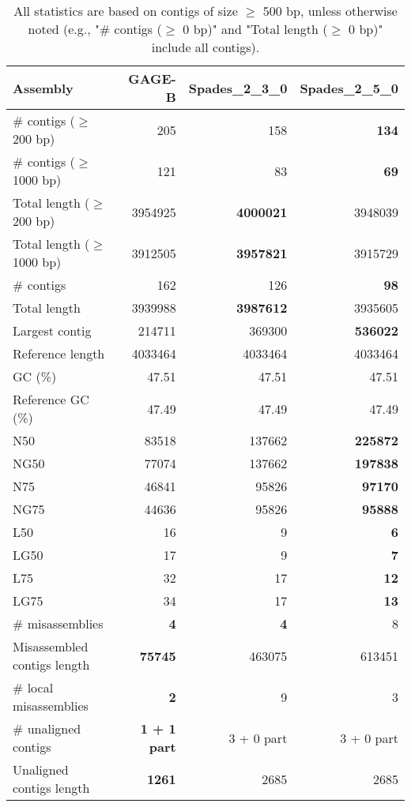 \documentclass[12pt,a4paper]{article}
\begin{document}
\begin{table}[ht]
\begin{center}
\caption{All statistics are based on contigs of size $\geq$ 500 bp, unless otherwise noted (e.g., "\# contigs ($\geq$ 0 bp)" and "Total length ($\geq$ 0 bp)" include all contigs).}
\begin{tabular}{|l*{3}{|r}|}
\hline
Assembly & GAGE-B & Spades\_2\_3\_0 & Spades\_2\_5\_0 \\ \hline
\# contigs ($\geq$ 200 bp) & 205 & 158 & {\bf 134} \\ \hline
\# contigs ($\geq$ 1000 bp) & 121 & 83 & {\bf 69} \\ \hline
Total length ($\geq$ 200 bp) & 3954925 & {\bf 4000021} & 3948039 \\ \hline
Total length ($\geq$ 1000 bp) & 3912505 & {\bf 3957821} & 3915729 \\ \hline
\# contigs & 162 & 126 & {\bf 98} \\ \hline
Total length & 3939988 & {\bf 3987612} & 3935605 \\ \hline
Largest contig & 214711 & 369300 & {\bf 536022} \\ \hline
Reference length & 4033464 & 4033464 & 4033464 \\ \hline
GC (\%) & 47.51 & 47.51 & 47.51 \\ \hline
Reference GC (\%) & 47.49 & 47.49 & 47.49 \\ \hline
N50 & 83518 & 137662 & {\bf 225872} \\ \hline
NG50 & 77074 & 137662 & {\bf 197838} \\ \hline
N75 & 46841 & 95826 & {\bf 97170} \\ \hline
NG75 & 44636 & 95826 & {\bf 95888} \\ \hline
L50 & 16 & 9 & {\bf 6} \\ \hline
LG50 & 17 & 9 & {\bf 7} \\ \hline
L75 & 32 & 17 & {\bf 12} \\ \hline
LG75 & 34 & 17 & {\bf 13} \\ \hline
\# misassemblies & {\bf 4} & {\bf 4} & 8 \\ \hline
Misassembled contigs length & {\bf 75745} & 463075 & 613451 \\ \hline
\# local misassemblies & {\bf 2} & 9 & 3 \\ \hline
\# unaligned contigs & {\bf 1 + 1 part} & 3 + 0 part & 3 + 0 part \\ \hline
Unaligned contigs length & {\bf 1261} & 2685 & 2685 \\ \hline

\end{tabular}
\end{center}
\end{table}
\end{document}
